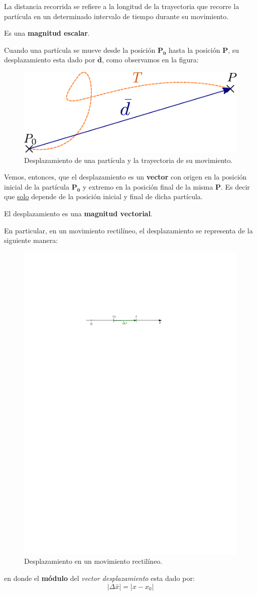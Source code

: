 
La distancia recorrida se refiere a la longitud de la trayectoria que recorre la partícula en un determinado intervalo de tiempo durante su movimiento.

Es una {\bf magnitud escalar}.




Cuando una partícula se mueve desde la posición $\mathbold{P_0}$ hasta la posición $\mathbold{P}$, su desplazamiento esta dado por $\mathbold{\bar{d}}$, como observamos en la figura:


\begin{figure}[h!]
\centering
 \includegraphics[width=.4\textwidth]{img/trayectoria_distancia.pdf}
  \caption{Desplazamiento de una partícula y la trayectoria de su movimiento.}
\end{figure}


Vemos, entonces, que el desplazamiento es un {\bf vector} con origen en la posición inicial de la partícula {$\mathbold{P_0}$} y extremo en la posición final de la misma {$\mathbold{P}$}. Es decir que \underline{solo} depende de la posición inicial y final de dicha partícula. 

El desplazamiento es una {\bf magnitud vectorial}.


En particular, en un movimiento rectilíneo, el desplazamiento se representa de la siguiente manera:


\begin{figure}[h!]
\centering
 \includegraphics[width=.5\textwidth]{img/deltax.pdf}
  \caption{Desplazamiento en un movimiento rectilíneo.}
\end{figure}
en donde el {\bf módulo} del {\it vector desplazamiento} esta dado por: $$|\Delta \bar{x}| = \vert x - x_0 \vert$$


